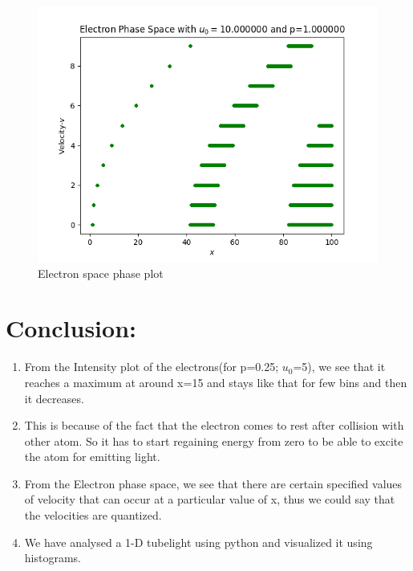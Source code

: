 \documentclass[11pt, a4paper]{article}
\begin{document}
\begin{figure}[!tbh]
\centering
\includegraphics[scale=0.56]{elec_phasa_space4.png} 
\caption{Electron space phase plot}
\label{fig:3fig_3}
\end{figure} 
\newpage
\newline
\newline\newline\newline
\section{Conclusion:}
\begin{enumerate}
    \item From the Intensity plot of the electrons(for p=0.25; $u_0$=5), we see that it reaches a maximum at around x=15 and stays like that for few bins and then it decreases.
    \item This is because of the fact that the electron comes to rest after collision with other atom. So it has to start regaining energy from zero to be able to excite the atom for emitting light.
    \item From the Electron phase space, we see that there are certain specified values of velocity that can occur at a particular value of x, thus we could say that the velocities are quantized.
    \item We have analysed a 1-D tubelight using python and visualized it using histograms. 
\end{enumerate}
\end{document}
